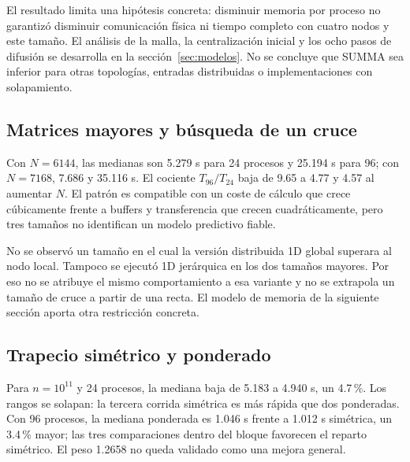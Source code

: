 El resultado limita una hipótesis concreta: disminuir memoria por proceso no garantizó disminuir comunicación física ni tiempo completo con cuatro nodos y este tamaño. El análisis de la malla, la centralización inicial y los ocho pasos de difusión se desarrolla en la sección~\ref{sec:modelos}. No se concluye que SUMMA sea inferior para otras topologías, entradas distribuidas o implementaciones con solapamiento.

\subsection{Matrices mayores y búsqueda de un cruce}


Con $N=6144$, las medianas son 5.279 s para 24 procesos y 25.194 s para 96; con $N=7168$, 7.686 y 35.116 s. El cociente $T_{96}/T_{24}$ baja de 9.65 a 4.77 y 4.57 al aumentar $N$. El patrón es compatible con un coste de cálculo que crece cúbicamente frente a buffers y transferencia que crecen cuadráticamente, pero tres tamaños no identifican un modelo predictivo fiable.

No se observó un tamaño en el cual la versión distribuida 1D global superara al nodo local. Tampoco se ejecutó 1D jerárquica en los dos tamaños mayores. Por eso no se atribuye el mismo comportamiento a esa variante y no se extrapola un tamaño de cruce a partir de una recta. El modelo de memoria de la siguiente sección aporta otra restricción concreta.

\subsection{Trapecio simétrico y ponderado}


\begin{table}[H]\caption{Tiempo y desbalance observados en cada repetición. Desbalance = máximo/mínimo del cálculo entre rangos.}\label{tab:trap-reps}

\end{table}

Para $n=10^{11}$ y 24 procesos, la mediana baja de 5.183 a 4.940 s, un 4.7\,\%. Los rangos se solapan: la tercera corrida simétrica es más rápida que dos ponderadas. Con 96 procesos, la mediana ponderada es 1.046 s frente a 1.012 s simétrica, un 3.4\,\% mayor; las tres comparaciones dentro del bloque favorecen el reparto simétrico. El peso 1.2658 no queda validado como una mejora general.

